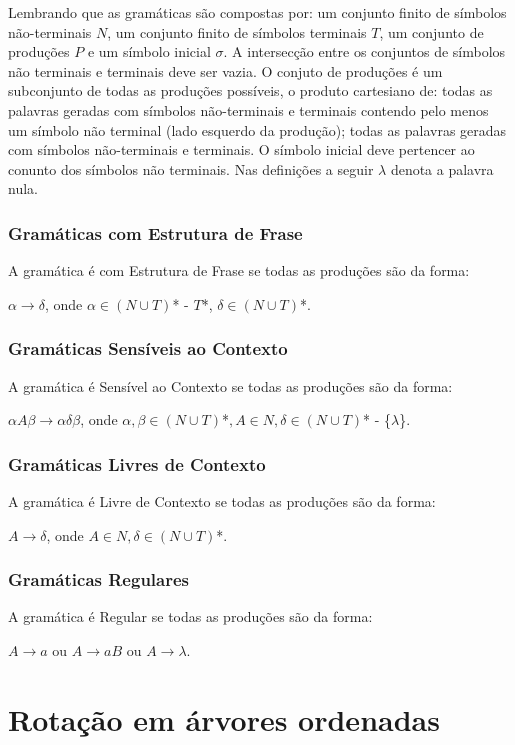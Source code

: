 Lembrando que as gramáticas são compostas por: um conjunto finito de símbolos não-terminais $N$, um conjunto finito de símbolos terminais $T$, um conjunto de produções $P$ e um símbolo inicial $\sigma$. A intersecção entre os conjuntos de símbolos não terminais e terminais deve ser vazia. O conjuto de produções é um subconjunto de todas as produções possíveis, o produto cartesiano de: todas as palavras geradas com símbolos não-terminais e terminais contendo pelo menos um símbolo não terminal (lado esquerdo da produção); todas as palavras geradas com símbolos não-terminais e terminais. O símbolo inicial deve pertencer ao conunto dos símbolos não terminais. Nas definições a seguir $\lambda$ denota a palavra nula. \cite{chomClass}

\subsection{Gramáticas com Estrutura de Frase}
A gramática é com Estrutura de Frase se todas as produções são da forma:

$\alpha \to \delta$, onde $\alpha \in (N \cup T)$* - $T$*, $\delta \in (N \cup T)$*.

\subsection{Gramáticas Sensíveis ao Contexto}
A gramática é Sensível ao Contexto se todas as produções são da forma:

$\alpha A\beta \to \alpha \delta \beta$, onde $\alpha,\beta \in (N \cup T)$*$, A \in N, \delta \in (N \cup T)$* - \{$\lambda$\}.

\subsection{Gramáticas Livres de Contexto}
A gramática é Livre de Contexto se todas as produções são da forma:

$A \to \delta$, onde $A \in N, \delta \in (N \cup T)$*.

\subsection{Gramáticas Regulares}
A gramática é Regular se todas as produções são da forma:

$A \to a$ ou $A \to aB$ ou $A \to \lambda$.

\chapter{Rotação em árvores ordenadas}

